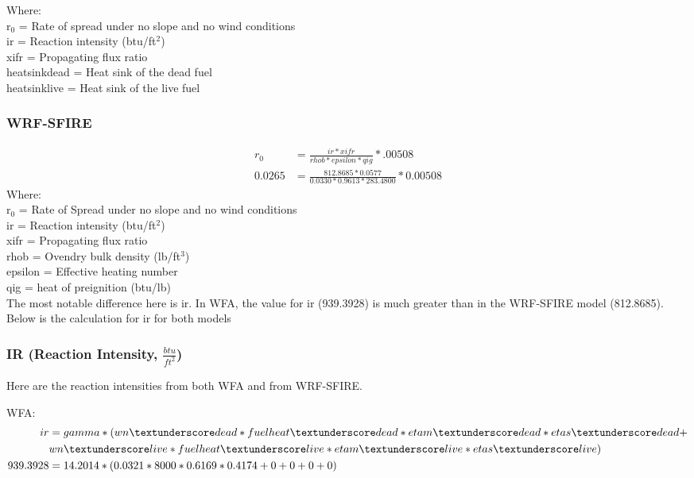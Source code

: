 \documentclass{article}
\newcommand\und{\textunderscore}
\begin{document}
\noindent Where: \\
r$_0$ = Rate of spread under no slope and no wind conditions \\
ir = Reaction intensity (btu/ft$^2$) \\
xifr = Propagating flux ratio \\
heat\und sink\und dead = Heat sink of the dead fuel \\
heat\und sink\und live = Heat sink of the live fuel
\subsubsection*{WRF-SFIRE}
\begin{equation}
	\label{WRF-ROS}
	\begin{split}
		r_0 &= \frac{ir*xifr}{rhob * epsilon *qig} * .00508 \\
		0.0265 &= \frac{812.8685 * 0.0577}{0.0330 * 0.9613 * 283.4800} * 0.00508
	\end{split}
\end{equation}
\noindent Where: \\
r$_0$ = Rate of Spread under no slope and no wind conditions \\
ir = Reaction intensity (btu/ft$^2$) \\
xifr = Propagating flux ratio \\
rhob = Ovendry bulk density (lb/ft$^3$) \\
epsilon = Effective heating number \\
qig = heat of preignition (btu/lb)\\

The most notable difference here is ir. In WFA, the value for ir (939.3928) is much greater than in the WRF-SFIRE model (812.8685). Below is the calculation for ir for both models 


\subsubsection{IR (Reaction Intensity, $\frac{btu}{ft^2}$)}
Here are the reaction intensities from both WFA and from WRF-SFIRE. 

WFA: 
\begin{equation}
\label{WFA_IR_2}
\begin{split}
		ir &= gamma * (wn\und dead * fuelheat\und dead * etam\und dead * etas\und dead + \\
		& wn\und live * fuelheat\und live * etam\und live * etas\und live) \\
        939.3928 &= 14.2014 * (0.0321 * 8000 * 0.6169 * 0.4174 + 0 + 0 + 0 + 0)
\end{split}
\end{equation}
	
\end{document}
